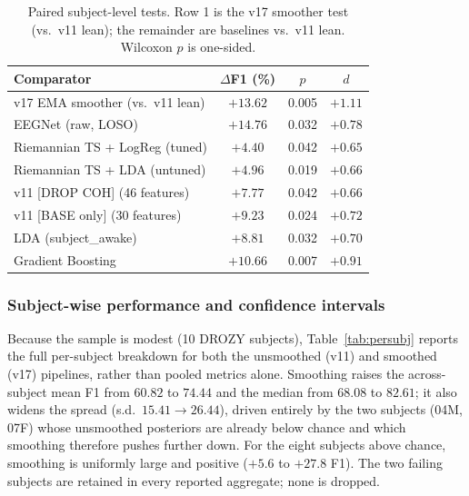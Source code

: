 \documentclass[journal]{IEEEtran}
\begin{document}
\begin{table}[t]
\caption{Paired subject-level tests. Row 1 is the v17 smoother test (vs.\ v11 lean); the remainder are baselines vs.\ v11 lean. Wilcoxon \(p\) is one-sided.}
\label{tab:paired}
\centering
\footnotesize
\setlength{\tabcolsep}{4pt}
\begin{tabular}{l c c c}
\toprule
Comparator                          & \(\Delta\)F1 (\%) & \(p\)      & \(d\) \\
\midrule
v17 EMA smoother (vs.\ v11 lean)    & \(+13.62\) & 0.005 & \(+1.11\) \\
EEGNet (raw, LOSO)                  & \(+14.76\) & 0.032 & \(+0.78\) \\
Riemannian TS + LogReg (tuned)      & \(+4.40\)  & 0.042 & \(+0.65\) \\
Riemannian TS + LDA (untuned)       & \(+4.96\)  & 0.019 & \(+0.66\) \\
v11 [DROP COH] (46 features)        & \(+7.77\)  & 0.042 & \(+0.66\) \\
v11 [BASE only] (30 features)       & \(+9.23\)  & 0.024 & \(+0.72\) \\
LDA (subject\_awake)                & \(+8.81\)  & 0.032 & \(+0.70\) \\
Gradient Boosting                   & \(+10.66\) & 0.007 & \(+0.91\) \\
\bottomrule
\end{tabular}
\end{table}

\subsubsection{Subject-wise performance and confidence intervals}
\label{sec:subjectwise}
Because the sample is modest (10 DROZY subjects), Table~\ref{tab:persubj} reports the full per-subject breakdown for both the unsmoothed (v11) and smoothed (v17) pipelines, rather than pooled metrics alone. Smoothing raises the across-subject mean F1 from \(60.82\) to \(74.44\) and the median from \(68.08\) to \(82.61\); it also widens the spread (s.d.\ \(15.41 \to 26.44\)), driven entirely by the two subjects (04M, 07F) whose unsmoothed posteriors are already below chance and which smoothing therefore pushes further down. For the eight subjects above chance, smoothing is uniformly large and positive (\(+5.6\) to \(+27.8\) F1). The two failing subjects are retained in every reported aggregate; none is dropped.
\end{document}
